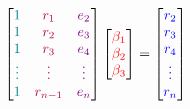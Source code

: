 \documentclass[12 pt]{slides}
\begin{document}
\begingroup
\[ 
\begin{bmatrix}\color{teal}1 & \color{purple}r_1 & \color{violet} e_2 \\
               \color{teal}1 & \color{purple}r_2 & \color{violet} e_3 \\
               \color{teal}1 & \color{purple}r_3 & \color{violet} e_4 \\
               \color{teal}\vdots & \color{purple}\vdots & \color{violet}\vdots \\
               \color{teal}1 & \color{purple}r_{n-1} & \color{violet} e_n
\end{bmatrix}
\begin{bmatrix}\color{red}\beta_1 \\
               \color{red}\beta_2 \\
               \color{red}\beta_3
\end{bmatrix} =
\begin{bmatrix}\color{blue}r_2 \\
                   \color{blue}r_3 \\
  		   \color{blue}r_4 \\ 
		   \color{blue}\vdots \\
                   \color{blue} r_n
\end{bmatrix}
\]

\endgroup
\end{document}
